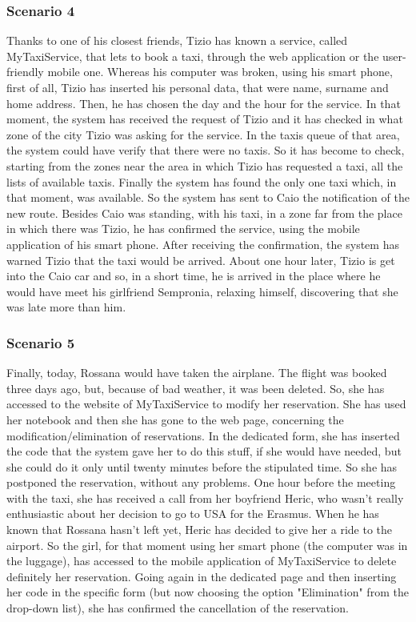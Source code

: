 		\subsubsection{Scenario 4}
		Thanks to one of his closest friends, Tizio has known a service, called MyTaxiService, that lets to book a taxi, through the web application or the user-friendly mobile one.
		Whereas his computer was broken, using his smart phone, first of all, Tizio has inserted his personal data, that were name, surname and home address. Then, he has chosen the day and the hour for the service. In that moment, the system has received the request of Tizio and it has checked in what zone of the city Tizio was asking for the service. In the taxis queue of that area, the system could have verify that there were no taxis. So it has become to check, starting from the zones near the area in which Tizio has requested a taxi, all the lists of available taxis. 
		Finally the system has found the only one taxi which, in that moment, was available. So the system has sent to Caio the notification of the new route. Besides Caio was standing, with his taxi, in a zone far from the place in which there was Tizio, he has confirmed the service, using the mobile application of his smart phone. After receiving the confirmation, the system has warned Tizio that the taxi would be arrived.
		About one hour later, Tizio is get into the Caio car and so, in a short time, he is arrived in the place where he would have meet his girlfriend Sempronia, relaxing himself, discovering that she was late more than him.

		\subsubsection{Scenario 5}
		Finally, today, Rossana would have taken the airplane. The flight was booked three days ago, but, because of bad weather, it was been deleted. So, she has accessed to the website of MyTaxiService to modify her reservation. She has used her notebook and then she has gone to the web page, concerning the modification/elimination of reservations. In the dedicated form, she has inserted the code that the system gave her to do this stuff, if she would have needed, but she could do it only until twenty minutes before the stipulated time. So she has postponed the reservation, without any problems.
		One hour before the meeting with the taxi, she has received a call from her boyfriend Heric, who wasn't really enthusiastic about her decision to go to USA for the Erasmus. When he has known that Rossana hasn't left yet, Heric has decided to give her a ride to the airport. So the girl, for that moment using her smart phone (the computer was in the luggage), has accessed to the mobile application of MyTaxiService to delete definitely her reservation. Going again in the dedicated page and then inserting her code in the specific form (but now choosing the option "Elimination" from the drop-down list), she has confirmed the cancellation of the reservation. 
	\newpage
